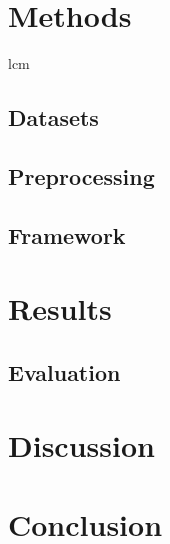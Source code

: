\documentclass[12pt,a4paper]{report}
\begin{document}
\chapter{Methods}
\label{sec:methods}
\acrfull{lcm}

\section{Datasets}
\label{sec:datasets}
\glsaddall %

\section{Preprocessing}
\label{sec:preprocessing}

\section{Framework}

\chapter{Results}
\label{sec:results}

\section{Evaluation}
\label{subsec:evaluation}


\chapter{Discussion}
\label{sec:dicussion}


\chapter{Conclusion}
\label{sec:conclusion}

\printbibliography

\appendix
\end{document}
